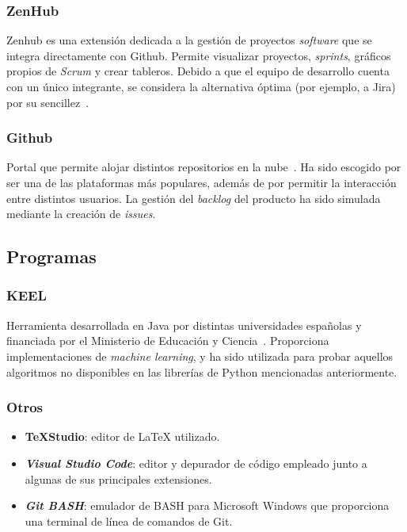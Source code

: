 \subsubsection{ZenHub}

Zenhub es una extensión dedicada a la gestión de proyectos \textit{software} que se integra directamente con Github. Permite visualizar proyectos, \textit{sprints}, gráficos propios de \textit{Scrum} y crear tableros. Debido a que el equipo de desarrollo cuenta con un único integrante, se considera la alternativa óptima (por ejemplo, a Jira) por su sencillez~\cite{zenhubHome}.

\subsubsection{Github}

Portal que permite alojar distintos repositorios en la nube~\cite{githubHome}. Ha sido escogido por ser una de las plataformas más populares, además de por permitir la interacción entre distintos usuarios. La gestión del \textit{backlog} del producto ha sido simulada mediante la creación de \textit{issues}.


\subsection{Programas}

\subsubsection{KEEL}

Herramienta desarrollada en Java por distintas universidades españolas y financiada por el Ministerio de Educación y Ciencia~\cite{keelRepo}. Proporciona implementaciones de \textit{machine learning}, y ha sido utilizada para probar aquellos algoritmos no disponibles en las librerías de Python mencionadas anteriormente.

\subsubsection{Otros}

\begin{itemize}
	\item \textbf{\TeX{}Studio}: editor de \LaTeX{} utilizado.
	\item \textbf{\textit{Visual Studio Code}}: editor y depurador de código empleado junto a algunas de sus principales extensiones.
	\item \textbf{\textit{Git BASH}}: emulador de BASH para Microsoft Windows que proporciona una terminal de línea de comandos de Git.
\end{itemize}




